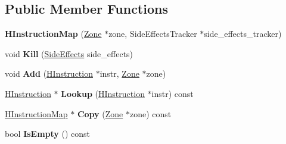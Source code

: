\subsection*{Public Member Functions}
\begin{DoxyCompactItemize}
\item 
{\bfseries H\+Instruction\+Map} (\hyperlink{classv8_1_1internal_1_1_zone}{Zone} $\ast$zone, Side\+Effects\+Tracker $\ast$side\+\_\+effects\+\_\+tracker)\hypertarget{classv8_1_1internal_1_1_h_instruction_map_a95e4896ecfe69b951c41c97cb666825f}{}\label{classv8_1_1internal_1_1_h_instruction_map_a95e4896ecfe69b951c41c97cb666825f}

\item 
void {\bfseries Kill} (\hyperlink{classv8_1_1internal_1_1_side_effects}{Side\+Effects} side\+\_\+effects)\hypertarget{classv8_1_1internal_1_1_h_instruction_map_a298a3a7ecae718863484bc5eb10916b6}{}\label{classv8_1_1internal_1_1_h_instruction_map_a298a3a7ecae718863484bc5eb10916b6}

\item 
void {\bfseries Add} (\hyperlink{classv8_1_1internal_1_1_h_instruction}{H\+Instruction} $\ast$instr, \hyperlink{classv8_1_1internal_1_1_zone}{Zone} $\ast$zone)\hypertarget{classv8_1_1internal_1_1_h_instruction_map_a82c2d4be91c0985959bbd13004422f7e}{}\label{classv8_1_1internal_1_1_h_instruction_map_a82c2d4be91c0985959bbd13004422f7e}

\item 
\hyperlink{classv8_1_1internal_1_1_h_instruction}{H\+Instruction} $\ast$ {\bfseries Lookup} (\hyperlink{classv8_1_1internal_1_1_h_instruction}{H\+Instruction} $\ast$instr) const \hypertarget{classv8_1_1internal_1_1_h_instruction_map_aedb2b07ef9c7e805b1a6504043381d6c}{}\label{classv8_1_1internal_1_1_h_instruction_map_aedb2b07ef9c7e805b1a6504043381d6c}

\item 
\hyperlink{classv8_1_1internal_1_1_h_instruction_map}{H\+Instruction\+Map} $\ast$ {\bfseries Copy} (\hyperlink{classv8_1_1internal_1_1_zone}{Zone} $\ast$zone) const \hypertarget{classv8_1_1internal_1_1_h_instruction_map_a8bb3b824273558215791bf5b16cb0837}{}\label{classv8_1_1internal_1_1_h_instruction_map_a8bb3b824273558215791bf5b16cb0837}

\item 
bool {\bfseries Is\+Empty} () const \hypertarget{classv8_1_1internal_1_1_h_instruction_map_a2489bdb24f9d638687b3cb0aec5d171c}{}\label{classv8_1_1internal_1_1_h_instruction_map_a2489bdb24f9d638687b3cb0aec5d171c}

\end{DoxyCompactItemize}
